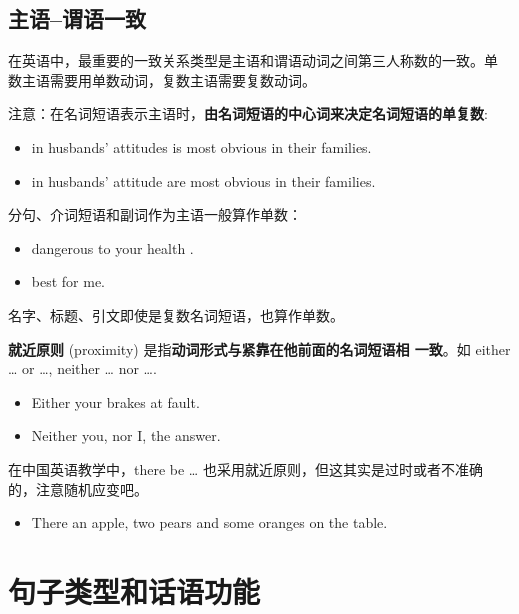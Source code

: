 \subsection{主语--谓语一致}

在英语中，最重要的一致关系类型是主语和谓语动词之间第三人称数的一致。单
数主语需要用单数动词，复数主语需要复数动词。

注意：在名词短语表示主语时，\textbf{由名词短语的中心词来决定名词短语的单复数}:
\begin{itemize}
\item {} in husbands' attitudes is most obvious in their families.
\item {} in husbands' attitude are most obvious in their families.
\end{itemize}

分句、介词短语和副词作为主语一般算作单数：
\begin{itemize}
\item {}  dangerous to your health .

\item {}  best for me.
\end{itemize}

名字、标题、引文即使是复数名词短语，也算作单数。

\textbf{就近原则} (proximity) 是指\textbf{动词形式与紧靠在他前面的名词短语相
  一致}。如 either \ldots{} or \ldots{}, neither \ldots{} nor \ldots{}.
\begin{itemize}
\item Either your brakes   at fault.
\item Neither you, nor I,   the answer.
\end{itemize}

在中国英语教学中，there be \ldots{} 也采用就近原则，但这其实是过时或者不准确
的，注意随机应变吧。
\begin{itemize}
\item There  an apple, two pears and some oranges on the table.
\end{itemize}

\section{句子类型和话语功能}

